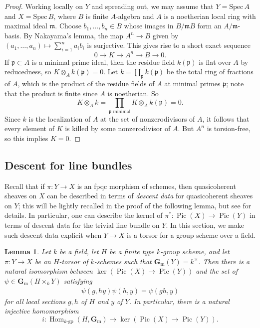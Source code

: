 \documentclass[11pt,reqno]{amsart}
\newtheorem{lemma}[theorem]{Lemma}
\theoremstyle{definition}
\renewcommand{\rm}{\mathrm}
\newcommand{\Spec}{\mathrm{Spec} \,}
\newcommand{\bG}{{\mathbf G}}
\newcommand{\fm}{\mathfrak{m}}
\newcommand{\fp}{\mathfrak{p}}
\newcommand{\bGm}{\bG_{\rm{m}}}
\DeclareMathOperator{\Hom}{Hom}
\DeclareMathOperator{\Pic}{Pic}
\newcommand{\gp}[1]{#1\textrm{-}\rm{gp}}
\begin{document}
\begin{proof}
	Working locally on $Y$ and spreading out, we may assume that $Y = \Spec A$ and $X = \Spec B$, where $B$ is finite $A$-algebra and $A$ is a noetherian local ring with maximal ideal $\fm$. Choose $b_1, \dots, b_n \in B$ whose images in $B/\fm B$ form an $A/\fm$-basis. By Nakayama's lemma, the map $A^n \to B$ given by $(a_1, \dots, a_n) \mapsto \sum_{i=1}^n a_ib_i$ is surjective. This gives rise to a short exact sequence
	\[
	0 \to K \to A^n \to B \to 0.
	\]
	If $\fp \subset A$ is a minimal prime ideal, then the residue field $k(\fp)$ is flat over $A$ by reducedness, so $K \otimes_A k(\fp) = 0$. Let $k = \prod_\fp k(\fp)$ be the total ring of fractions of $A$, which is the product of the residue fields of $A$ at minimal primes $\fp$; note that the product is finite since $A$ is noetherian. So
	\[
	K \otimes_A k = \prod_{\fp \text{ minimal}} K \otimes_A k(\fp) = 0. 
	\]
	Since $k$ is the localization of $A$ at the set of nonzerodivisors of $A$, it follows that every element of $K$ is killed by some nonzerodivisor of $A$. But $A^n$ is torsion-free, so this implies $K = 0$.
\end{proof}







\subsection{Descent for line bundles}

Recall that if $\pi\colon Y \to X$ is an fpqc morphism of schemes, then quasicoherent sheaves on $X$ can be described in terms of \textit{descent data} for quasicoherent sheaves on $Y$; this will be lightly recalled in the proof of the following lemma, but see \cite[Chapter 6]{BLR} for details. In particular, one can describe the kernel of $\pi^*\colon \Pic(X) \to \Pic(Y)$ in terms of descent data for the trivial line bundle on $Y$. In this section, we make such descent data explicit when $Y \to X$ is a torsor for a group scheme over a field.

\begin{lemma}\label{lemma:descent}
	Let $k$ be a field, let $H$ be a finite type $k$-group scheme, and let $\pi\colon Y \to X$ be an $H$-torsor of $k$-schemes such that $\bGm(Y) = k^\times$. Then there is a natural isomorphism between $\ker(\Pic(X) \to \Pic(Y))$ and the set of $\psi \in \bGm(H \times_k Y)$ satisfying
	\begin{align}\label{align:relation}
	\psi(g, hy)\psi(h, y) = \psi(gh, y)
	\end{align}
	for all local sections $g, h$ of $H$ and $y$ of $Y$. In particular, there is a natural injective homomorphism
	\[
	i\colon \Hom_{\gp{k}}(H, \bGm) \to \ker(\Pic(X) \to \Pic(Y)).
	\]
\end{lemma}
\end{document}
